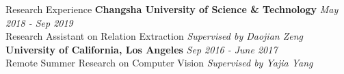 \documentclass{resume} %
\begin{document}
\begin{rSection}{Research Experience}
    {\bf Changsha University of Science \& Technology} \hfill {\em May 2018 - Sep 2019} 
\\ Research Assistant on Relation Extraction \hfill {\em Supervised by Daojian Zeng}
\\{\bf University of California, Los Angeles} \hfill {\em Sep 2016 - June 2017} 
\\ Remote Summer Research on Computer Vision \hfill {\em Supervised by Yajia Yang}
\end{rSection}
\end{document}
